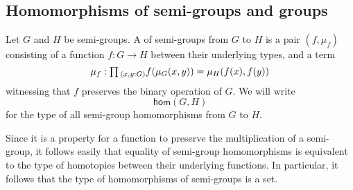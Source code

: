 \subsection{Homomorphisms of semi-groups and groups}

\begin{defn}
  Let $G$ and $H$ be semi-groups. A  of semi-groups from $G$ to $H$ is a pair $(f,\mu_f)$ consisting of a function $f:G\to H$ between their underlying types, and a term
  \begin{equation*}
    \mu_f:\prd{x,y:G} f(\mu_G(x,y))=\mu_H(f(x),f(y))
  \end{equation*}
  witnessing that $f$ preserves the binary operation of $G$. We will write
  \begin{equation*}
    \mathsf{hom}(G,H)
  \end{equation*}
  for the type of all semi-group homomorphisms from $G$ to $H$.
\end{defn}

\begin{rmk}\label{rmk:is-set-hom-semi-group}
  Since it is a property for a function to preserve the multiplication of a semi-group, it follows easily that equality of semi-group homomorphisms is equivalent to the type of homotopies between their underlying functions. In particular, it follows that the type of homomorphisms of semi-groups is a set.
\end{rmk}

